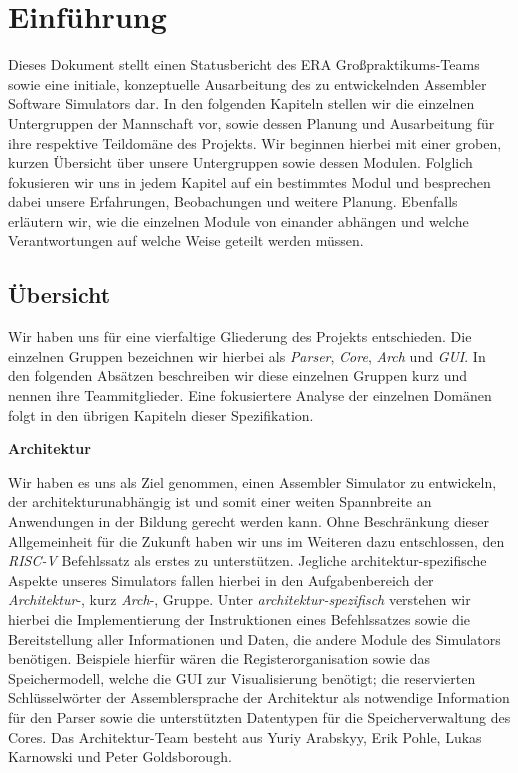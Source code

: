 \chapter{Einführung}

Dieses Dokument stellt einen Statusbericht des ERA Großpraktikums-Teams sowie
eine initiale, konzeptuelle Ausarbeitung des zu entwickelnden Assembler Software
Simulators dar. In den folgenden Kapiteln stellen wir die einzelnen Untergruppen
der Mannschaft vor, sowie dessen Planung und Ausarbeitung für ihre respektive
Teildomäne des Projekts. Wir beginnen hierbei mit einer groben, kurzen Übersicht
über unsere Untergruppen sowie dessen Modulen. Folglich fokusieren wir uns in
jedem Kapitel auf ein bestimmtes Modul und besprechen dabei unsere Erfahrungen,
Beobachungen und weitere Planung. Ebenfalls erläutern wir, wie die einzelnen
Module von einander abhängen und welche Verantwortungen auf welche Weise geteilt
werden müssen.

\section{Übersicht}

Wir haben uns für eine vierfaltige Gliederung des Projekts entschieden. Die
einzelnen Gruppen bezeichnen wir hierbei als \emph{Parser}, \emph{Core},
\emph{Arch} und \emph{GUI}. In den folgenden Absätzen beschreiben wir diese
einzelnen Gruppen kurz und nennen ihre Teammitglieder. Eine fokusiertere Analyse
der einzelnen Domänen folgt in den übrigen Kapiteln dieser Spezifikation.

\textbf{Architektur}

Wir haben es uns als Ziel genommen, einen Assembler Simulator zu entwickeln, der
architekturunabhängig ist und somit einer weiten Spannbreite an Anwendungen in
der Bildung gerecht werden kann. Ohne Beschränkung dieser Allgemeinheit für die
Zukunft haben wir uns im Weiteren dazu entschlossen, den \emph{RISC-V}
Befehlssatz als erstes zu unterstützen. Jegliche architektur-spezifische Aspekte
unseres Simulators fallen hierbei in den Aufgabenbereich der
\emph{Architektur}-, kurz \emph{Arch}-, Gruppe. Unter
\emph{architektur-spezifisch} verstehen wir hierbei die Implementierung der
Instruktionen eines Befehlssatzes sowie die Bereitstellung aller Informationen
und Daten, die andere Module des Simulators benötigen. Beispiele hierfür wären
die Registerorganisation sowie das Speichermodell, welche die GUI zur
Visualisierung benötigt; die reservierten Schlüsselwörter der Assemblersprache
der Architektur als notwendige Information für den Parser sowie die
unterstützten Datentypen für die Speicherverwaltung des Cores. Das
Architektur-Team besteht aus Yuriy Arabskyy, Erik Pohle, Lukas Karnowski und
Peter Goldsborough.

